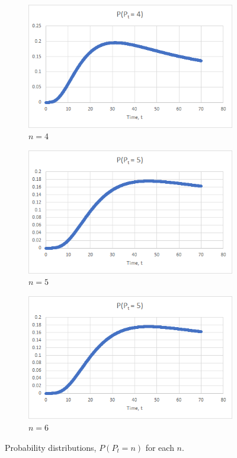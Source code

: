 \documentclass{article}
\begin{document}
\begin{figure}
	\begin{subfigure}{.5\textwidth}
		\centering
		\includegraphics[width=.8\linewidth]{PofPteq4}
		\caption{$n = 4$}
		\label{PofPteq4}
	\end{subfigure}
	\begin{subfigure}{.5\textwidth}
		\centering
		\includegraphics[width=.8\linewidth]{PofPteq5}
		\caption{$n = 5$}
		\label{PofPteq5}
	\end{subfigure}
	\begin{subfigure}{.5\textwidth}
		\centering
		\includegraphics[width=.8\linewidth]{PofPteq5}
		\caption{$n = 6$}
		\label{PofPteq6}
	\end{subfigure}
	\caption{Probability distributions, $P(P_t = n)$ for each $n$.}
\label{PofPteqn}
\end{figure}
\end{document}

